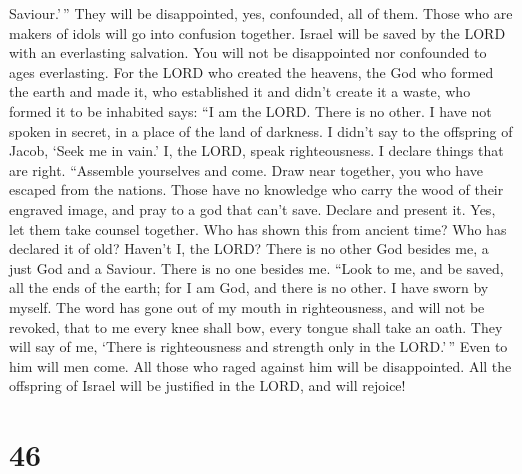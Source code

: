 Saviour.'\,''  They will be disappointed, yes, confounded,
all of them. Those who are makers of idols will go into confusion
together.  Israel will be saved by the LORD with an
everlasting salvation. You will not be disappointed nor confounded to
ages everlasting.  For the LORD who created the heavens,
the God who formed the earth and made it, who established it and didn't
create it a waste, who formed it to be inhabited says: ``I am the LORD.
There is no other.  I have not spoken in secret, in a place
of the land of darkness. I didn't say to the offspring of Jacob, `Seek
me in vain.' I, the LORD, speak righteousness. I declare things that are
right.  ``Assemble yourselves and come. Draw near together,
you who have escaped from the nations. Those have no knowledge who carry
the wood of their engraved image, and pray to a god that can't save.
 Declare and present it. Yes, let them take counsel
together. Who has shown this from ancient time? Who has declared it of
old? Haven't I, the LORD? There is no other God besides me, a just God
and a Saviour. There is no one besides me.  ``Look to me,
and be saved, all the ends of the earth; for I am God, and there is no
other.  I have sworn by myself. The word has gone out of my
mouth in righteousness, and will not be revoked, that to me every knee
shall bow, every tongue shall take an oath.  They will say
of me, `There is righteousness and strength only in the LORD.'\,'' Even
to him will men come. All those who raged against him will be
disappointed.  All the offspring of Israel will be
justified in the LORD, and will rejoice!

\hypertarget{section-44}{%
\section{46}\label{section-44}}

